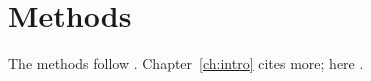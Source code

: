 \chapter{Methods}
The methods follow \citet{knuth84}.
Chapter~\ref{ch:intro} cites more; here \citep[p.~42]{lamport94}.
